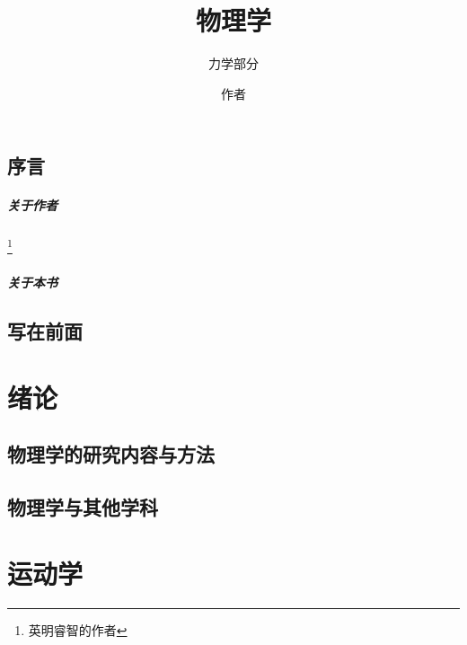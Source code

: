 \documentclass[color=purple,openany]{textbook-cn}
\title{物理学}
\subtitle{力学部分}
\author{作者}
\begin{document}
\fontsize{12.5pt}{0.8\baselineskip}\selectfont

\makecover


\maketitle



\frontmatter



\chapter*{序言}
\subsubsection{关于作者}\footnote{英明睿智的作者}
\lipsum
\subsubsection{关于本书}


\chapter*{写在前面}
\lipsum





\printnomenclature

\tableofcontents

\listoffigures

\mainmatter
\tcbstartrecording



\part{绪论}

\chaptersaying{\lipsum[1][1]}
\chapter{物理学的研究内容与方法}
\lipsum


\chaptersaying{\lipsum[1][2]}
\chapter{物理学与其他学科}
\lipsum




\part{运动学}
\end{document}

